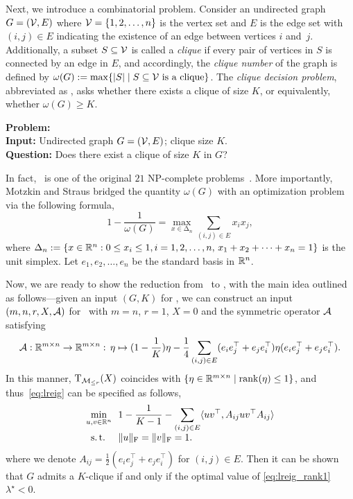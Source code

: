 Next, we introduce a combinatorial problem. Consider an undirected graph $G = (\mathcal{V}, E)$ where $\mathcal{V}=\{1,2,\ldots,n\}$ is the vertex set and $E$ is the edge set with $(i, j) \in E$ indicating the existence of an edge between vertices $i$ and~$j$. Additionally, a subset $S\subseteq \mathcal{V}$ is called a \emph{clique} if every pair of vertices in $S$ is connected by an edge in $E$, and accordingly, the \emph{clique number} of the graph is defined by $\omega(G):=\max\{|S|\mid S\subseteq \mathcal{V}\ \text{is a clique}\}$. The \emph{clique decision problem}, abbreviated as \clique, asks whether there exists a clique of size $K$, or equivalently, whether $\omega(G)\ge K$.
\begin{tcolorbox}[
colframe=black,
colback=white,
boxrule=0.5pt,    %
arc=2mm,          %
left=2mm, right=2mm, top=2mm, bottom=2mm %
]
\textbf{Problem:} \clique
\\
\textbf{Input:} Undirected graph $G = (\mathcal{V}, E)$; clique size $K$.
\\
\textbf{Question:} Does there exist a clique of size $K$ in $G$?
\end{tcolorbox}

In fact, \clique\ is one of the original $21$ NP-complete problems~\cite{karp1972reducibility}. More importantly, Motzkin and Straus \cite{motzkin1965maxima} bridged the quantity $\omega(G)$ with an optimization problem via the following formula,
\begin{equation}\label{eg:MS_omegaG}
    1-\frac{1}{\omega(G)}=\max_{x\in\mathrm{\Delta}_n}\sum_{(i,j)\in E}x_ix_j,
\end{equation}
where $\mathrm{\Delta}_n:=\{x\in\mathbb{R}^n:0\le x_i\le 1, i=1,2,\ldots,n,\,x_1+x_2+\cdots+x_n=1\}$ is the unit simplex. Let $e_1,e_2,\ldots,e_n$ be the standard basis in $\mathbb{R}^n$.

Now, we are ready to show the reduction from \clique\ to \verifysec, with the main idea outlined as follows---given an input $(G,K)$ for \clique, we can construct an input $(m,n,r,X,\mathcal{A})$ for \verifysec\ 
with $m=n$, $r=1$, $X=0$ and the symmetric operator $\mathcal{A}$ satisfying
\[
\mathcal{A}:\mathbb{R}^{m\times n}\to\mathbb{R}^{m\times n}:\,\eta\mapsto (1-\frac{1}{K})\eta-\frac{1}{4}\sum_{(i,j)\in E} (e_ie_j^\top+e_je_i^\top)\eta(e_ie_j^\top+e_je_i^\top).
\]
In this manner, $\mathrm{T}_{\mathcal{M}_{\le r}}(X)$ coincides with $\{\eta\in\mathbb{R}^{m\times n}\mid\operatorname{rank}(\eta)\le 1\}$, and thus~\eqref{eq:lreig} can be specified as follows,
\begin{equation}\label{eq:lreig_rank1}
\begin{aligned}
    \min_{u,v\in\mathbb{R}^n}\ \ & 1-\frac{1}{K-1} - \sum_{(i,j)\in E} \langle {uv^\top,A_{ij}uv^\top A_{ij}} \rangle
    \\[-1.5mm]
    \mathrm{s.\,t.}\ \ \ \ & \|u\|_{\mathrm{F}} = \|v\|_{\mathrm{F}} = 1.
    \end{aligned}
\end{equation}
where we denote $A_{ij}=\frac{1}{2}(e_ie_j^\top+e_je_i^\top)$ for $(i,j)\in E$. Then it can be shown that $G$ admits a $K$-clique if and only if the optimal value of \eqref{eq:lreig_rank1} $\lambda^\star<0$.

